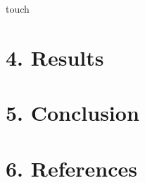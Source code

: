 \documentclass[
]{article}
\newenvironment{Shaded}{\begin{snugshade}}{\end{snugshade}}
\newcommand{\FunctionTok}[1]{\textcolor[rgb]{0.00,0.00,0.00}{#1}}
\begin{document}
\begin{Shaded}
\begin{Highlighting}[]
\FunctionTok{touch}
\end{Highlighting}
\end{Shaded}

\hypertarget{results}{%
\section{4. Results}\label{results}}

\hypertarget{conclusion}{%
\section{5. Conclusion}\label{conclusion}}

\hypertarget{references}{%
\section{6. References}\label{references}}
\end{document}
